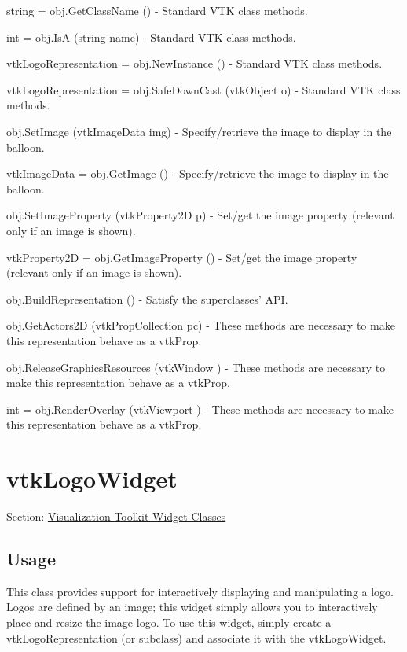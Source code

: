 \begin{DoxyItemize}
\item {\ttfamily string = obj.\-Get\-Class\-Name ()} -\/ Standard V\-T\-K class methods.  
\item {\ttfamily int = obj.\-Is\-A (string name)} -\/ Standard V\-T\-K class methods.  
\item {\ttfamily vtk\-Logo\-Representation = obj.\-New\-Instance ()} -\/ Standard V\-T\-K class methods.  
\item {\ttfamily vtk\-Logo\-Representation = obj.\-Safe\-Down\-Cast (vtk\-Object o)} -\/ Standard V\-T\-K class methods.  
\item {\ttfamily obj.\-Set\-Image (vtk\-Image\-Data img)} -\/ Specify/retrieve the image to display in the balloon.  
\item {\ttfamily vtk\-Image\-Data = obj.\-Get\-Image ()} -\/ Specify/retrieve the image to display in the balloon.  
\item {\ttfamily obj.\-Set\-Image\-Property (vtk\-Property2\-D p)} -\/ Set/get the image property (relevant only if an image is shown).  
\item {\ttfamily vtk\-Property2\-D = obj.\-Get\-Image\-Property ()} -\/ Set/get the image property (relevant only if an image is shown).  
\item {\ttfamily obj.\-Build\-Representation ()} -\/ Satisfy the superclasses' A\-P\-I.  
\item {\ttfamily obj.\-Get\-Actors2\-D (vtk\-Prop\-Collection pc)} -\/ These methods are necessary to make this representation behave as a vtk\-Prop.  
\item {\ttfamily obj.\-Release\-Graphics\-Resources (vtk\-Window )} -\/ These methods are necessary to make this representation behave as a vtk\-Prop.  
\item {\ttfamily int = obj.\-Render\-Overlay (vtk\-Viewport )} -\/ These methods are necessary to make this representation behave as a vtk\-Prop.  
\end{DoxyItemize}\hypertarget{vtkwidgets_vtklogowidget}{}\section{vtk\-Logo\-Widget}\label{vtkwidgets_vtklogowidget}
Section\-: \hyperlink{sec_vtkwidgets}{Visualization Toolkit Widget Classes} \hypertarget{vtkwidgets_vtkxyplotwidget_Usage}{}\subsection{Usage}\label{vtkwidgets_vtkxyplotwidget_Usage}
This class provides support for interactively displaying and manipulating a logo. Logos are defined by an image; this widget simply allows you to interactively place and resize the image logo. To use this widget, simply create a vtk\-Logo\-Representation (or subclass) and associate it with the vtk\-Logo\-Widget.

